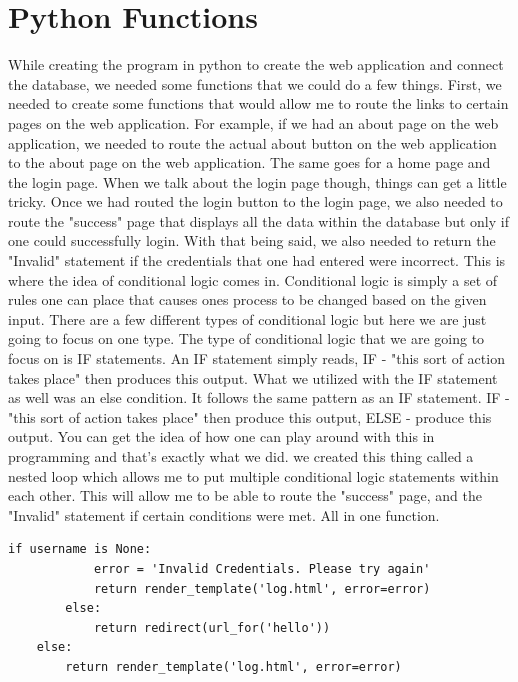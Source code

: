 \bigskip
\bigskip


\section{Python Functions}
\label{sec:python functions}

While creating the program in python to create the web application and connect the database, we needed some functions that we could do a few things. First, we needed to create some functions that would allow me to route the links to certain pages on the web application. For example, if we had an about page on the web application, we needed to route the actual about button on the web application to the about page on the web application. The same goes for a home page and the login page. When we talk about the login page though, things can get a little tricky. Once we had routed the login button to the login page, we also needed to route the "success" page that displays all the data within the database but only if one could successfully login. With that being said, we also needed to return the "Invalid" statement if the credentials that one had entered were incorrect. This is where the idea of conditional logic comes in. Conditional logic is simply a set of rules one can place that causes ones process to be changed based on the given input. There are a few different types of conditional logic but here we are just going to focus on one type. The type of conditional logic that we are going to focus on is IF statements. An IF statement simply reads, IF - "this sort of action takes place" then produces this output. What we utilized with the IF statement as well was an else condition. It follows the same pattern as an IF statement. IF - "this sort of action takes place" then produce this output, ELSE - produce this output. You can get the idea of how one can play around with this in programming and that's exactly what we did. we created this thing called a nested loop which allows me to put multiple conditional logic statements within each other. This will allow me to be able to route the "success" page, and the "Invalid" statement if certain conditions were met. All in one function.

\begin{lstlisting}
if username is None:
            error = 'Invalid Credentials. Please try again'
            return render_template('log.html', error=error)
        else:
            return redirect(url_for('hello'))
    else:
        return render_template('log.html', error=error)
\end{lstlisting}

